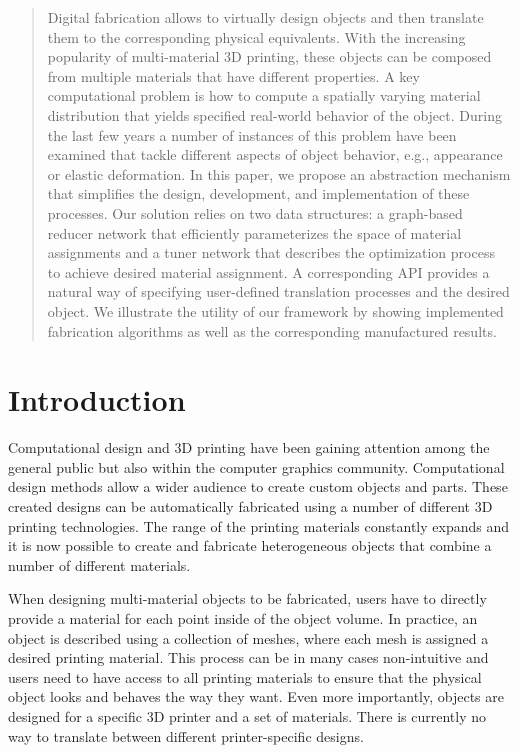 \documentclass[annual]{acmsiggraph}
\newcommand{\note}[1]{\marginpar{\LARGE $\spadesuit$}
			$\spadesuit$ {\bf #1} $\spadesuit$}
\begin{document}
\begin{abstract}
Digital fabrication allows to virtually design objects and then translate them to the corresponding physical equivalents.
With the increasing popularity of multi-material 3D printing, these objects can be composed from multiple materials that have different properties.
A key computational problem is how to compute a spatially varying material distribution that yields specified real-world behavior of the object.
During the last few years a number of instances of this problem have been examined that tackle different aspects of object behavior, e.g.,  appearance or elastic deformation.
In this paper, we propose an abstraction mechanism that simplifies the design, development, and implementation of these processes.
Our solution relies on two data structures: a graph-based reducer network that efficiently parameterizes the space of material assignments and a tuner network that describes the optimization process to achieve desired material assignment. A corresponding API provides a natural way of specifying user-defined translation processes and the desired object.  
We illustrate the utility of our framework by showing implemented fabrication algorithms as well as the corresponding manufactured results.
\end{abstract}

\keywordlist

\TOGlinkslist

\copyrightspace

\section{Introduction}
Computational design and 3D printing have been gaining attention among the general public but also within the computer graphics community.
Computational design methods allow a wider audience to create custom objects and parts.
These created designs can be automatically fabricated using a number of different 3D printing technologies.
The range of the printing materials constantly expands and it is now possible to create and fabricate heterogeneous objects that combine a number of different materials.

When designing multi-material objects to be fabricated, users have to directly provide a material for each point inside of the object volume.
In practice, an object is described using a collection of meshes, where each mesh is assigned a desired printing material.
This process can be in many cases non-intuitive and users need to have access to all printing materials to ensure that the physical object looks and behaves the way they want.
Even more importantly, objects are designed for a specific 3D printer and a set of materials. There is currently no way to translate between different printer-specific designs.
\end{document}
